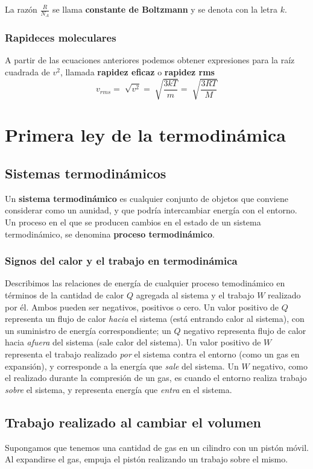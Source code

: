 \documentclass[12pt]{article}
\begin{document}
  La razón $ \frac{R}{N_{A}} $ se llama \textbf{constante de Boltzmann} y se denota con la letra $ k $.

  \subsubsection{Rapideces moleculares}
  A partir de las ecuaciones anteriores podemos obtener expresiones para la raíz cuadrada de $ v^{2} $, llamada \textbf{rapidez eficaz} o \textbf{rapidez rms}
  \[
    v_{rms} = \sqrt[]{v^{2}} = \sqrt[]{\frac{3kT}{m}} = \sqrt[]{\frac{3RT}{M}}
  \]

  \section{Primera ley de la termodinámica}
  \subsection{Sistemas termodinámicos}
  Un \textbf{sistema termodinámico} es cualquier conjunto de objetos que conviene considerar como un aunidad, y que podría intercambiar energía con el entorno. Un proceso en el que se producen cambios en el estado de un sistema termodinámico, se denomina \textbf{proceso termodinámico}.

  \subsubsection{Signos del calor y el trabajo en termodinámica}
  Describimos las relaciones de energía de cualquier proceso temodinámico en términos de la cantidad de calor $ Q $ agregada al sistema y el trabajo $ W $ realizado por él. Ambos pueden ser negativos, positivos o cero. Un valor positivo de $ Q $ representa un flujo de calor \textit{hacia} el sistema (está entrando calor al sistema), con un suministro de energía correspondiente; un $ Q $ negativo representa flujo de calor hacia \textit{afuera} del sistema (sale calor del sistema). Un valor positivo de $ W $ representa el trabajo realizado \textit{por} el sistema contra el entorno (como un gas en expansión), y corresponde a la energía que \textit{sale} del sistema. Un $ W $ negativo, como el realizado durante la compresión de un gas, es cuando el entorno realiza trabajo \textit{sobre} el sistema, y representa energía que \textit{entra} en el sistema.

  \subsection{Trabajo realizado al cambiar el volumen}
  Supongamos que tenemos una cantidad de gas en un cilindro con un pistón móvil. Al expandirse el gas, empuja el pistón realizando un trabajo sobre el mismo.
\end{document}
